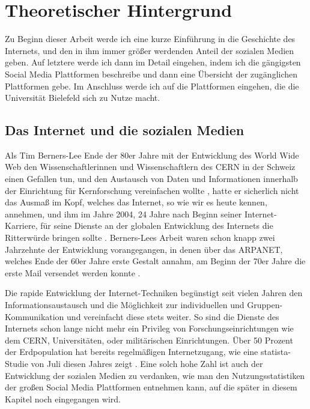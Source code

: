 \chapter{Theoretischer Hintergrund}
\label{chap:Theorie}
\pagestyle{plain}

Zu Beginn dieser Arbeit werde ich eine kurze Einführung in die Geschichte des Internets, und den in ihm immer größer werdenden Anteil der sozialen Medien geben. Auf letztere werde ich dann im Detail eingehen, indem ich die gängigsten Social Media Plattformen beschreibe und dann eine Übersicht der zugänglichen Plattformen gebe. Im Anschluss werde ich auf die Plattformen eingehen, die die Universität Bielefeld sich zu Nutze macht.

\section{Das Internet und die sozialen Medien}

Als Tim Berners-Lee Ende der 80er Jahre mit der Entwicklung des World Wide Web den Wissenschaftlerinnen und Wissenschaftlern des CERN in der Schweiz einen Gefallen tun, und den Austausch von Daten und Informationen innerhalb der Einrichtung für Kernforschung vereinfachen wollte \cite{w3cpeople}, hatte er sicherlich nicht das Ausmaß im Kopf, welches das Internet, so wie wir es heute kennen, annehmen, und ihm im Jahre 2004, 24 Jahre nach Beginn seiner Internet-Karriere, für seine Dienste an der globalen Entwicklung des Internets die Ritterwürde bringen sollte \cite{w3cbernerslee}. Berners-Lees Arbeit waren schon knapp zwei Jahrzehnte der Entwicklung vorangegangen, in denen über das ARPANET, welches Ende der 60er Jahre erste Gestalt annahm, am Beginn der 70er Jahre die erste Mail versendet werden konnte \cite{gillies2000web}.

Die rapide Entwicklung der Internet-Techniken begünstigt seit vielen Jahren den Informationsaustausch und die Möglichkeit zur individuellen und Gruppen-Kommunikation und vereinfacht diese stets weiter. So sind die Dienste des Internets schon lange nicht mehr ein Privileg von Forschungseinrichtungen wie dem CERN, Universitäten, oder militärischen Einrichtungen. Über 50 Prozent der Erdpopulation hat bereits regelmäßigen Internetzugang, wie eine statista-Studie von Juli diesen Jahres zeigt \cite{statista2018digpop}. Eine solch hohe Zahl ist auch der Entwicklung der sozialen Medien zu verdanken, wie man den Nutzungsstatistiken der großen Social Media Plattformen entnehmen kann, auf die später in diesem Kapitel noch eingegangen wird.

